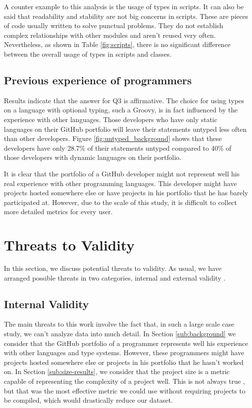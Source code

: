\documentclass[preprint]{sigplanconf}
\begin{document}
A counter example to this analysis is the usage of types in scripts.
It can also be said that readability and stability are not big concerns in scripts.
These are pieces of code usually written to solve punctual problems.
They do not establish complex relationships with other modules and aren't reused very often.
Nevertheless, as shown in Table \ref{fig:scripts}, there is no significant difference between the overall usage of types in scripts and classes.


\subsection{Previous experience of programmers\label{discussion-q3}}
Results indicate that the answer for Q3 is affirmative.
The choice for using types on a language with optional typing, such a Groovy, is in fact influenced by the experience  with other languages.
Those developers who have only static languages on their GitHub portfolio will leave their statements untyped less often than other developers.
Figure \ref{fig:untyped_background} shows that these developers have only 28.7\% of their statements untyped compared to 40\% of those developers with dynamic languages on their portfolio. 

It is clear that the portfolio of a GitHub developer might not represent well his real experience with other programming languages.
This developer might have projects hosted somewhere else or have projects in his portfolio that he has barely participated at.
However, due to the scale of this study, it is difficult to collect more detailed metrics for every user.











%
%
\section{Threats to Validity\label{sec:ameaca}}
In this section, we discuss potential threats to validity. As usual, we have arranged possible threats in two categories, internal and external validity \cite{Campbell1963}.


\subsection*{Internal Validity}
The main threats to this work involve the fact that, in such a large scale case study, we can't analyze data into much detail.
In Section \ref{sub:background} we consider that the GitHub portfolio of a programmer represents well his experience with other languages and type systems.
However, these programmers might have projects hosted somewhere else or projects in his portfolio that he hasn't worked on.
In Section \ref{sub:size-results}, we consider that the project size is a metric capable of representing the complexity of a project well.
This is not always true \cite{Fenton1998}, but that was the most effective metric we could use without requiring projects to be compiled, which would drastically reduce our dataset.
\end{document}
